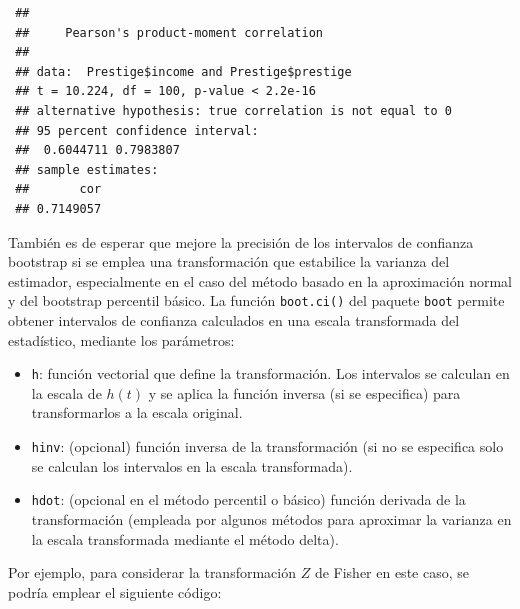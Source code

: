 \documentclass[
]{book}
\theoremstyle{break}
\theoremstyle{nonumberplain}
\begin{document}
\begin{verbatim}
 ## 
 ##     Pearson's product-moment correlation
 ## 
 ## data:  Prestige$income and Prestige$prestige
 ## t = 10.224, df = 100, p-value < 2.2e-16
 ## alternative hypothesis: true correlation is not equal to 0
 ## 95 percent confidence interval:
 ##  0.6044711 0.7983807
 ## sample estimates:
 ##       cor 
 ## 0.7149057
\end{verbatim}

También es de esperar que mejore la precisión de los intervalos de confianza bootstrap si se emplea una transformación que estabilice la varianza del estimador, especialmente en el caso del método basado en la aproximación normal y del bootstrap percentil básico.
La función \texttt{boot.ci()} del paquete \texttt{boot} permite obtener intervalos de confianza calculados en una escala transformada del estadístico, mediante los parámetros:

\begin{itemize}
\item
  \texttt{h}: función vectorial que define la transformación.
  Los intervalos se calculan en la escala de \(h(t)\) y se aplica la función inversa (si se especifica) para transformarlos a la escala original.
\item
  \texttt{hinv}: (opcional) función inversa de la transformación
  (si no se especifica solo se calculan los intervalos en la escala transformada).
\item
  \texttt{hdot}: (opcional en el método percentil o básico) función derivada de la transformación
  (empleada por algunos métodos para aproximar la varianza en la escala transformada mediante el método delta).
\end{itemize}

Por ejemplo, para considerar la transformación \(Z\) de Fisher en este caso, se podría emplear el siguiente código:
\end{document}
